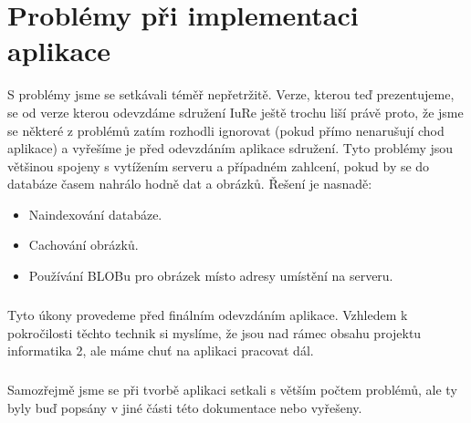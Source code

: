 \chapter{Problémy při implementaci aplikace}
S problémy jsme se setkávali téměř nepřetržitě. Verze, kterou teď prezentujeme, se od verze kterou odevzdáme sdružení IuRe ještě trochu liší právě proto, že jsme se některé z problémů zatím rozhodli ignorovat (pokud přímo nenarušují chod aplikace) a vyřešíme je před odevzdáním aplikace sdružení. Tyto problémy jsou většinou spojeny s vytížením serveru a případném zahlcení, pokud by se do databáze časem nahrálo hodně dat a obrázků. Řešení je nasnadě:
\begin{itemize}
\item Naindexování databáze.
\item Cachování obrázků.
\item Používání BLOBu pro obrázek místo adresy umístění na serveru.
\end{itemize}
\paragraph{}
Tyto úkony provedeme před finálním odevzdáním aplikace. Vzhledem k pokročilosti těchto technik si myslíme, že jsou nad rámec obsahu projektu informatika 2, ale máme chu\v{t} na aplikaci pracovat dál. 
\paragraph{}
Samozřejmě jsme se při tvorbě aplikaci setkali s větším počtem problémů, ale ty byly bu\v{d} popsány v jiné části této dokumentace nebo vyřešeny.
